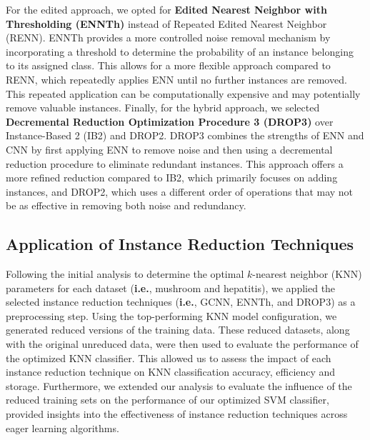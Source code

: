 For the edited approach, we opted for \textbf{Edited Nearest Neighbor with Thresholding (ENNTh)} \cite{Wilson2000,ENNTH}
instead of Repeated Edited Nearest Neighbor (RENN). ENNTh provides a more controlled noise removal mechanism by
incorporating a threshold to determine the probability of an instance belonging to its assigned class. 
This allows for a more flexible approach compared to RENN, which repeatedly applies ENN until no further 
instances are removed. This repeated application can be computationally expensive and may potentially 
remove valuable instances. Finally, for the hybrid approach, we selected 
\textbf{Decremental Reduction Optimization Procedure 3 (DROP3)} \cite{Wilson2000}
over Instance-Based 2 (IB2) and DROP2. DROP3 combines the strengths of ENN and CNN by first applying 
ENN to remove noise and then using a decremental reduction procedure to eliminate redundant instances.
This approach offers a more refined reduction compared to IB2, which primarily focuses on adding instances,
and DROP2, which uses a different order of operations that may not be as effective in removing both noise and
redundancy.


\subsection*{Application of Instance Reduction Techniques}

Following the initial analysis to determine the optimal $k$-nearest neighbor (KNN)
parameters for each dataset (\textbf{i.e.}, mushroom and hepatitis), we applied the selected instance reduction techniques
(\textbf{i.e.}, GCNN, ENNTh, and DROP3) as a preprocessing step. Using the top-performing KNN model configuration,
we generated reduced versions of the training data. These reduced datasets, along with the original
unreduced data, were then used to evaluate the performance of the optimized KNN classifier. 
This allowed us to assess the impact of each instance reduction technique on KNN classification 
accuracy, efficiency and storage. Furthermore, we extended our analysis to evaluate the influence of the reduced training sets
on the performance of our optimized SVM classifier, provided insights into the effectiveness of instance reduction techniques across eager learning algorithms.



